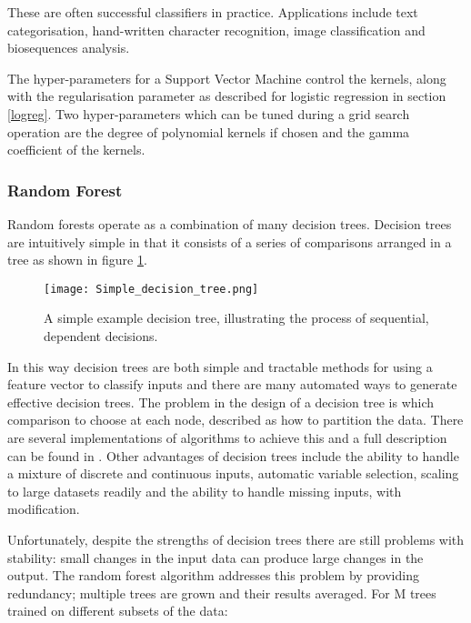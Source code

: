 These are often successful classifiers in practice.
Applications include text categorisation, hand-written character recognition, image classification and biosequences analysis\autocite{cristianini_an_2000}.

The hyper-parameters for a Support Vector Machine control the kernels, along with the regularisation parameter as described for logistic regression in section \ref{logreg}.
Two hyper-parameters which can be tuned during a grid search operation are the degree of polynomial kernels if chosen and the gamma coefficient of the kernels.


\subsubsection{Random Forest}
\label{randomforest}

Random forests operate as a combination of many decision trees.
Decision trees are intuitively simple in that it consists of a series of comparisons arranged in a tree as shown in figure \ref{fig:dectree}.

\begin{figure}
    \centering
    \texttt{[image: Simple\_decision\_tree.png]}
    \caption{A simple example decision tree, illustrating the process of sequential, dependent decisions.}
    \label{fig:dectree}
\end{figure}

In this way decision trees are both simple and tractable methods for using a feature vector to classify inputs and there are many automated ways to generate effective decision trees.
The problem in the design of a decision tree is which comparison to choose at each node, described as how to partition the data\autocite[544]{murphy_machine_2012}. %
There are several implementations of algorithms to achieve this and a full description can be found in \textcite[544]{murphy_machine_2012}.
Other advantages of decision trees include the ability to handle a mixture of discrete and continuous inputs, automatic variable selection, scaling to large datasets readily and the ability to handle missing inputs, with modification.


Unfortunately, despite the strengths of decision trees there are still problems with stability: small changes in the input data can produce large changes in the output\autocite{murphy_machine_2012}.
The random forest algorithm addresses this problem by providing redundancy; multiple trees are grown and their results averaged.
For M trees trained on different subsets of the data\autocite{murphy_machine_2012}:

